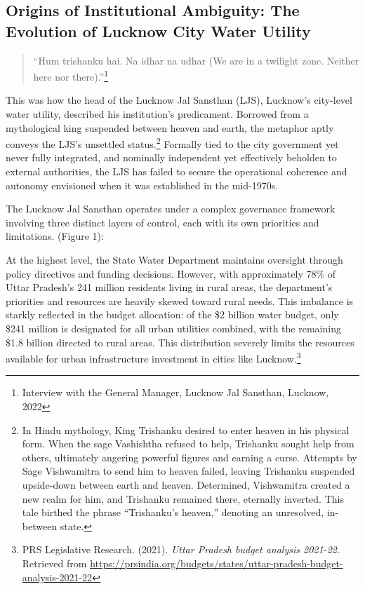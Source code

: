 \subsection{Origins of Institutional Ambiguity: The Evolution of Lucknow City Water Utility}

\begin{quote} “Hum trishanku hai. Na idhar na udhar (We are in a twilight zone. Neither here nor there).”\footnote{Interview with the General Manager, Lucknow Jal Sansthan, Lucknow, 2022} 
\end{quote}

This was how the head of the Lucknow Jal Sansthan (LJS), Lucknow’s city-level water utility, described his institution’s predicament. Borrowed from a mythological king suspended between heaven and earth, the metaphor aptly conveys the LJS’s unsettled status.\footnote{In Hindu mythology, King Trishanku desired to enter heaven in his physical form. When the sage Vashishtha refused to help, Trishanku sought help from others, ultimately angering powerful figures and earning a curse. Attempts by Sage Vishwamitra to send him to heaven failed, leaving Trishanku suspended upside-down between earth and heaven. Determined, Vishwamitra created a new realm for him, and Trishanku remained there, eternally inverted. This tale birthed the phrase “Trishanku’s heaven,” denoting an unresolved, in-between state.} Formally tied to the city government yet never fully integrated, and nominally independent yet effectively beholden to external authorities, the LJS has failed to secure the operational coherence and autonomy envisioned when it was established in the mid-1970s. 

The Lucknow Jal Sansthan operates under a complex governance framework involving three distinct layers of control, each with its own priorities and limitations. (Figure 1):

At the highest level, the State Water Department maintains oversight through policy directives and funding decisions. However, with approximately 78\% of Uttar Pradesh's 241 million residents living in rural areas, the department's priorities and resources are heavily skewed toward rural needs. This imbalance is starkly reflected in the budget allocation: of the \$2 billion water budget, only \$241 million is designated for all urban utilities combined, with the remaining \$1.8 billion directed to rural areas. This distribution severely limits the resources available for urban infrastructure investment in cities like Lucknow.\footnote{PRS Legislative Research. (2021). \textit{Uttar Pradesh budget analysis 2021-22}. Retrieved from \url{https://prsindia.org/budgets/states/uttar-pradesh-budget-analysis-2021-22}} 

